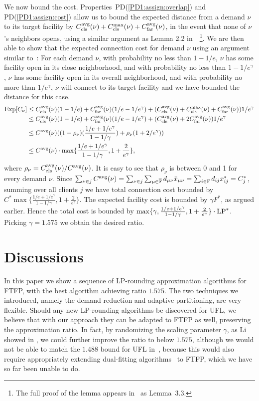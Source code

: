 \documentclass[11pt]{article}
\begin{document}
We now bound the
cost. Properties~PD(\ref{PD1:assign:overlap}) and
PD(\ref{PD1:assign:cost}) allow us to bound the expected
distance from a demand $\nu$ to its target facility by
$C_{\text{cls}}^{{\mbox{\scriptsize\rm avg}}}(\nu)+C_{\text{cls}}^{\max}(\nu)+C_{\text{far}}^{{\mbox{\scriptsize\rm avg}}}(\nu)$, in the event
that none of $\nu$'s neighbors opens, using a similar
argument as Lemma 2.2 in~\cite{ByrkaGS10}~\footnote{The full
  proof of the lemma appears in~\cite{ByrkaA10} as
  Lemma~3.3.}. We are then able to show that the expected
connection cost for demand $\nu$ using an argument similar
to~\cite{ByrkaGS10}: For each demand $\nu$, with probability
no less than $1-1/e$, $\nu$ has some facility open in its
close neighborhood, and with probability no less than
$1-1/e^\gamma$, $\nu$ has some facility open in its overall
neighborhood, and with probability no more than
$1/e^\gamma$, $\nu$ will connect to its target facility and
we have bounded the distance for this case.
%
\begin{align*}
  \mbox{\rm Exp}[C_{\nu}] &\leq C_{\text{cls}}^{{\mbox{\scriptsize\rm avg}}}(\nu)(1-1/e) +
  C_{\text{far}}^{{\mbox{\scriptsize\rm avg}}}(\nu)(1/e-1/e^\gamma) + (C_{\text{cls}}^{{\mbox{\scriptsize\rm avg}}}(\nu)+C_{\text{cls}}^{\max}(\nu)+C_{\text{far}}^{{\mbox{\scriptsize\rm avg}}}(\nu))1/e^\gamma \\
  &\leq C_{\text{cls}}^{{\mbox{\scriptsize\rm avg}}}(\nu)(1-1/e) +
  C_{\text{far}}^{{\mbox{\scriptsize\rm avg}}}(\nu)(1/e-1/e^\gamma) + (C_{\text{cls}}^{{\mbox{\scriptsize\rm avg}}}(\nu)+2C_{\text{far}}^{{\mbox{\scriptsize\rm avg}}}(\nu))1/e^\gamma\\
  &\leq
  C^{{\mbox{\scriptsize\rm avg}}}(\nu)((1-\rho_{\nu})(\frac{1/e+1/e^\gamma}{1-1/\gamma})
  + \rho_{\nu}(1+2/e^\gamma)) \\
  &\leq C^{{\mbox{\scriptsize\rm avg}}}(\nu) \cdot
  \max\{\frac{1/e+1/e^\gamma}{1-1/\gamma},
  1+\frac{2}{e^\gamma}\},
\end{align*}
%
where $\rho_{\nu}=C_{\text{cls}}^{{\mbox{\scriptsize\rm avg}}}(\nu)/C^{{\mbox{\scriptsize\rm avg}}}(\nu)$. It is easy
to see that $\rho_{\nu}$ is between 0 and 1 for every demand
$\nu$.  Since $\sum_{\nu\in j} C^{{\mbox{\scriptsize\rm avg}}}(\nu) = \sum_{\nu\in
  j}\sum_{\mu\in\overline{\mathbb{F}}} d_{\mu\nu}{\bar x}_{\mu\nu} =
\sum_{i\in\mathbb{F}} d_{ij}x_{ij}^\ast = C_j^\ast$, summing
over all clients $j$ we have total connection cost bounded
by $C^\ast \max\{\frac{1/e+1/e^\gamma}{1-1/\gamma},
1+\frac{2}{e^\gamma}\}$. The expected facility cost is
bounded by $\gamma F^\ast$, as argued earlier. Hence the
total cost is bounded by $\max\{\gamma,
\frac{1/e+1/e^\gamma}{1-1/\gamma},
1+\frac{2}{e^\gamma}\}\cdot \mbox{\rm LP}^\ast$. Picking
$\gamma=1.575$ we obtain the desired ratio.

\section{Discussions}

In this paper we show a sequence of LP-rounding approximation algorithms
for FTFP, with the best algorithm achieving  ratio $1.575$. The two techniques we introduced,
namely the demand reduction and adaptive partitioning, are very flexible. Should any new
LP-rounding algorithms be discovered for UFL, we believe that with our approach they can be
adapted to FTFP as well, preserving the approximation ratio. In fact, by randomizing the
scaling parameter $\gamma$, as Li showed in \cite{Li11}, we
could further improve the ratio to below $1.575$, although we would not be
able to match the $1.488$ bound for UFL in~\cite{Li11}, because this would
also require appropriately extending dual-fitting algorithms~\cite{MahdianYZ06}
to FTFP, which we have so far been unable to do.
\end{document}

